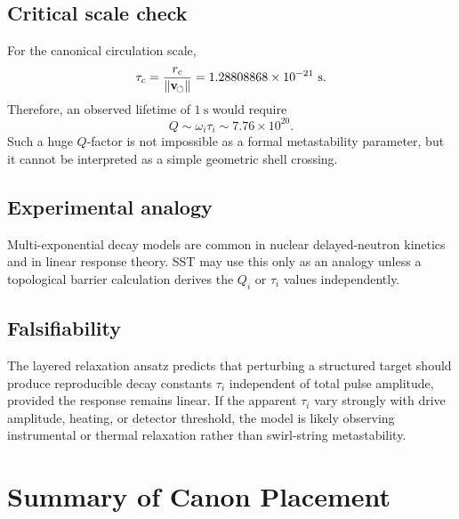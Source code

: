     \subsection*{Critical scale check}
        
        For the canonical circulation scale,
        \begin{equation}
            \tau_c
            =
            \frac{r_c}{\lVert\mathbf{v}_{\!\boldsymbol{\circlearrowleft}}\rVert}
            =
            1.28808868\times10^{-21}\ \mathrm{s}.
            \label{eq:core_crossing_time_numeric}
        \end{equation}
        Therefore, an observed lifetime of \(1\ \mathrm{s}\) would require
        \begin{equation}
            Q
            \sim
            \omega_i\tau_i
            \sim
            7.76\times10^{20}.
            \label{eq:large_Q_warning}
        \end{equation}
        Such a huge \(Q\)-factor is not impossible as a formal metastability parameter, but it cannot be interpreted as a simple geometric shell crossing.
    
    \subsection*{Experimental analogy}
        
        Multi-exponential decay models are common in nuclear delayed-neutron kinetics and in linear response theory. SST may use this only as an analogy unless a topological barrier calculation derives the \(Q_i\) or \(\tau_i\) values independently.
    
    \subsection*{Falsifiability}
        
        The layered relaxation ansatz predicts that perturbing a structured target should produce reproducible decay constants \(\tau_i\) independent of total pulse amplitude, provided the response remains linear. If the apparent \(\tau_i\) vary strongly with drive amplitude, heating, or detector threshold, the model is likely observing instrumental or thermal relaxation rather than swirl-string metastability.

\section{Summary of Canon Placement}
    \label{app:canon-placement-summary}
    
